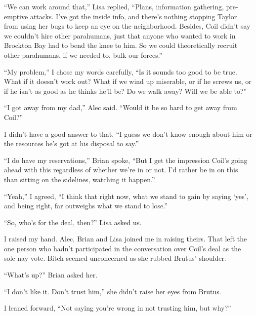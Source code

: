 ``We can work around that,'' Lisa replied, ``Plans, information gathering, pre-emptive attacks. I've got the inside info, and there's nothing stopping Taylor from using her bugs to keep an eye on the neighborhood.  Besides, Coil didn't say we couldn't hire other parahumans, just that anyone who wanted to work in Brockton Bay had to bend the knee to him.  So we could theoretically recruit other parahumans, if we needed to, bulk our forces.''



``My problem,'' I chose my words carefully, ``Is it sounds too good to be true.  What if it doesn't work out?  What if we wind up miserable, or if he screws us, or if he isn't as good as he thinks he'll be?  Do we walk away?  Will we be able to?''



``I got away from my dad,'' Alec said.  ``Would it be so hard to get away from Coil?''



I didn't have a good answer to that.  ``I guess we don't know enough about him or the resources he's got at his disposal to say.''



``I do have my reservations,'' Brian spoke, ``But I get the impression Coil's going ahead with this regardless of whether we're in or not.  I'd rather be in on this than sitting on the sidelines, watching it happen.''



``Yeah,'' I agreed, ``I think that right now, what we stand to gain by saying `yes', and being right, far outweighs what we stand to lose.''



``So, who's for the deal, then?'' Lisa asked us.



I raised my hand.  Alec, Brian and Lisa joined me in raising theirs.  That left the one person who hadn't participated in the conversation over Coil's deal as the sole nay vote.  Bitch seemed unconcerned as she rubbed Brutus' shoulder.



``What's up?'' Brian asked her.



``I don't like it.  Don't trust him,'' she didn't raise her eyes from Brutus.



I leaned forward, ``Not saying you're wrong in not trusting him, but why?''



